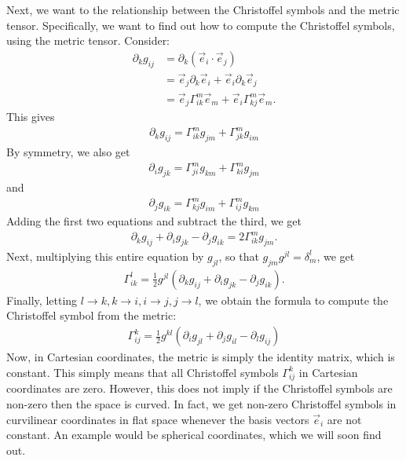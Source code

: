 \documentclass{article}
\theoremstyle{definition}
\begin{document}
Next, we want to the relationship between the Christoffel symbols and the metric tensor. Specifically, we want to find out how to compute the Christoffel symbols, using the metric tensor. Consider:
\begin{align*}
\partial_k g_{ij} &= \partial_k\left(\vec{e}_i\cdot\vec{e}_j \right) \\
&= \vec{e}_j\partial_k\vec{e}_i + \vec{e}_i\partial_k\vec{e}_j\\
&= \vec{e}_j \Gamma^{m}_{ik}\vec{e}_m + \vec{e}_i\Gamma^{m}_{kj}\vec{e}_m.
\end{align*}
This gives
\begin{align*}
\boxed{\partial_k g_{ij} = \Gamma^{m}_{ik}g_{jm} + \Gamma^{m}_{jk}g_{im}}
\end{align*}
By symmetry, we also get
\begin{align*}
\boxed{\partial_i g_{jk} = \Gamma^{m}_{ji}g_{km} + \Gamma^{m}_{ki}g_{jm}}
\end{align*}
and
\begin{align*}
\boxed{\partial_j g_{ik} = \Gamma^{m}_{kj}g_{im} + \Gamma^{m}_{ij}g_{km}}
\end{align*}
Adding the first two equations and subtract the third, we get
\begin{align*}
\partial_k g_{ij} + \partial_i g_{jk} - \partial_j g_{ik} = 2\Gamma^{m}_{ik}g_{jm}.
\end{align*}
Next, multiplying this entire equation by $g_{jl}$, so that $g_{jm}g^{jl} = \delta^l_m$, we get
\begin{align*}
\Gamma^{l}_{ik} = \frac{1}{2}g^{jl}\left( \partial_k g_{ij} + \partial_i g_{jk} - \partial_j g_{ik}\right).
\end{align*}
Finally, letting $l\rightarrow k, k\rightarrow i, i\rightarrow j, j\rightarrow l $, we obtain the formula to compute the Christoffel symbol from the metric:
\begin{align*}
\boxed{\Gamma^{k}_{ij} = \frac{1}{2}g^{kl}\left( \partial_i g_{jl} + \partial_j g_{il} - \partial_l g_{ij}\right)}
\end{align*}
Now, in Cartesian coordinates, the metric is simply the identity matrix, which is constant. This simply means that all Christoffel symbols $\Gamma^{k}_{ij}$ in Cartesian coordinates are zero. However, this does not imply if the Christoffel symbols are non-zero then the space is curved. In fact, we get non-zero Christoffel symbols in curvilinear coordinates in flat space whenever the basis vectors $\vec{e}_i$ are not constant. An example would be spherical coordinates, which we will soon find out.\\
\end{document}
